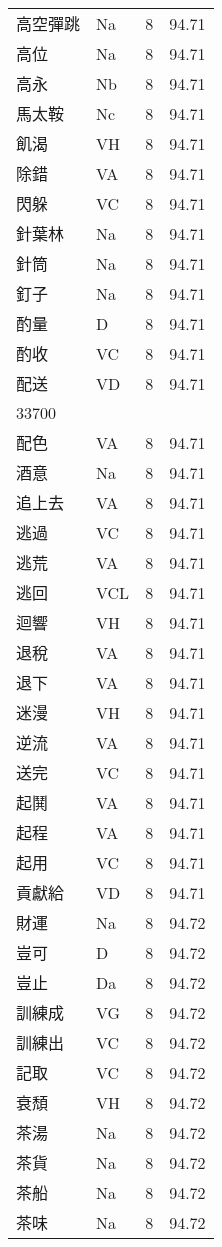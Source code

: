 \documentclass[twocolumn]{book}
\begin{document}
\begin{supertabular}{llrr}
高空彈跳 & Na & 8 &  94.71\\
高位 & Na & 8 &  94.71\\
高永 & Nb & 8 &  94.71\\
馬太鞍 & Nc & 8 &  94.71\\
飢渴 & VH & 8 &  94.71\\
除錯 & VA & 8 &  94.71\\
閃躲 & VC & 8 &  94.71\\
針葉林 & Na & 8 &  94.71\\
針筒 & Na & 8 &  94.71\\
釘子 & Na & 8 &  94.71\\
酌量 & D & 8 &  94.71\\
酌收 & VC & 8 &  94.71\\
配送 & VD & 8 &  94.71\\
33700\\
配色 & VA & 8 &  94.71\\
酒意 & Na & 8 &  94.71\\
追上去 & VA & 8 &  94.71\\
逃過 & VC & 8 &  94.71\\
逃荒 & VA & 8 &  94.71\\
逃回 & VCL & 8 &  94.71\\
迴響 & VH & 8 &  94.71\\
退稅 & VA & 8 &  94.71\\
退下 & VA & 8 &  94.71\\
迷漫 & VH & 8 &  94.71\\
逆流 & VA & 8 &  94.71\\
送完 & VC & 8 &  94.71\\
起鬨 & VA & 8 &  94.71\\
起程 & VA & 8 &  94.71\\
起用 & VC & 8 &  94.71\\
貢獻給 & VD & 8 &  94.71\\
財運 & Na & 8 &  94.72\\
豈可 & D & 8 &  94.72\\
豈止 & Da & 8 &  94.72\\
訓練成 & VG & 8 &  94.72\\
訓練出 & VC & 8 &  94.72\\
記取 & VC & 8 &  94.72\\
衰頹 & VH & 8 &  94.72\\
茶湯 & Na & 8 &  94.72\\
茶貨 & Na & 8 &  94.72\\
茶船 & Na & 8 &  94.72\\
茶味 & Na & 8 &  94.72\\

\end{supertabular}
\end{document}
